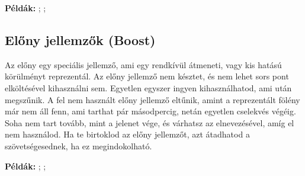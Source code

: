 \textbf{Példák:} ; ; 

\label{Előny jellemzők}
\subsection[Előny jellemzők]{Előny jellemzők (Boost)}

Az előny egy speciális jellemző, ami egy rendkívül átmeneti, vagy kis hatású körülményt reprezentál. Az előny jellemző nem késztet, és nem lehet sors pont elköltésével kihasználni sem. Egyetlen egyszer ingyen kihasználhatod, ami után megszűnik. A fel nem használt előny jellemző eltűnik, amint a reprezentált fölény már nem áll fenn, ami tarthat pár másodpercig, netán egyetlen cselekvés végéig. Soha nem tart tovább, mint a jelenet vége, és várhatsz az elnevezésével, amíg el nem használod. Ha te birtoklod az előny jellemzőt, azt átadhatod a szövetségesednek, ha ez megindokolható.

\textbf{Példák:} ; ; 
